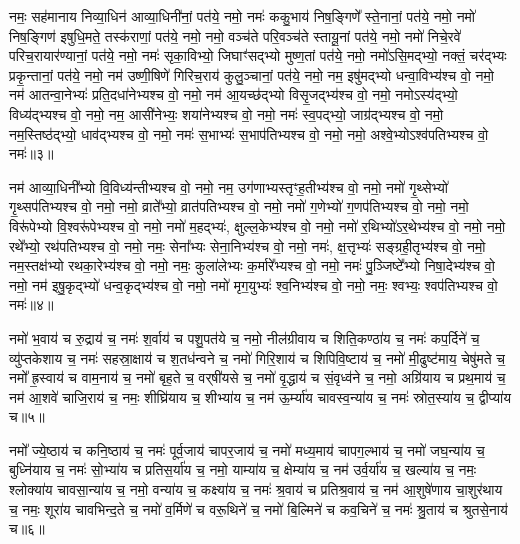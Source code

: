 नमः॒ सह॑मानाय निव्या॒धिन॑ आव्या॒धिनी॑नां॒ पत॑ये॒ नमो॒ नमः॑ ककु॒भाय॑ निष॒ङ्गिणे᳚ स्ते॒नानां॒ पत॑ये॒ नमो॒ नमो॑ निष॒ङ्गिण॑ इषुधि॒मते॒ तस्क॑राणां॒ पत॑ये॒ नमो॒ नमो॒ वञ्च॑ते परि॒वञ्च॑ते स्तायू॒नां पत॑ये॒ नमो॒ नमो॑ निचे॒रवे॑ परिच॒रायार॑ण्यानां॒ पत॑ये॒ नमो॒ नमः॑ सृका॒विभ्यो॒ जिघाꣳ॑सद्भ्यो मुष्ण॒तां पत॑ये॒ नमो॒ नमो॑ऽसि॒मद्भ्यो॒ नक्तं॒ चर॑द्भ्यः प्रकृ॒न्तानां॒ पत॑ये॒ नमो॒ नम॑ उष्णी॒षिणे॑ गिरिच॒राय॑ कुलु॒ञ्चानां॒ पत॑ये॒ नमो॒ नम॒ इषु॑मद्भ्यो धन्वा॒विभ्य॑श्च वो॒ नमो॒ नम॑ आतन्वा॒नेभ्यः॑ प्रति॒दधा॑नेभ्यश्च वो॒ नमो॒ नम॑ आ॒यच्छ॑द्भ्यो विसृ॒जद्भ्य॑श्च वो॒ नमो॒ नमोऽस्य॑द्भ्यो॒ विध्य॑द्भ्यश्च वो॒ नमो॒ नम॒ आसी॑नेभ्यः॒ शया॑नेभ्यश्च वो॒ नमो॒ नमः॑ स्व॒पद्भ्यो॒ जाग्र॑द्भ्यश्च वो॒ नमो॒ नम॒स्तिष्ठ॑द्भ्यो॒ धाव॑द्भ्यश्च वो॒ नमो॒ नमः॑ स॒भाभ्यः॑ स॒भाप॑तिभ्यश्च वो॒ नमो॒ नमो॒ अश्वे॒भ्योऽश्व॑पतिभ्यश्च वो॒ नमः॑॥३॥ 

नम॑ आव्या॒धिनी᳚भ्यो वि॒विध्य॑न्तीभ्यश्च वो॒ नमो॒ नम॒ उग॑णाभ्यस्तृꣳ\-ह॒तीभ्य॑श्च वो॒ नमो॒ नमो॑ गृ॒थ्सेभ्यो॑ गृ॒थ्सप॑तिभ्यश्च वो॒ नमो॒ नमो॒ व्राते᳚भ्यो॒ व्रात॑पतिभ्यश्च वो॒ नमो॒ नमो॑ ग॒णेभ्यो॑ ग॒णप॑तिभ्यश्च वो॒ नमो॒ नमो॒ विरू॑पेभ्यो वि॒श्वरू॑पेभ्यश्च वो॒ नमो॒ नमो॑ म॒हद्भ्यः॑, क्षुल्ल॒केभ्य॑श्च वो॒ नमो॒ नमो॑ र॒थिभ्यो॑ऽर॒थेभ्य॑श्च वो॒ नमो॒ नमो॒ रथे᳚भ्यो॒ रथ॑पतिभ्यश्च वो॒ नमो॒ नमः॒ सेना᳚भ्यः सेना॒निभ्य॑श्च वो॒ नमो॒ नमः॑, क्ष॒त्तृभ्यः॑ सङ्ग्रही॒तृभ्य॑श्च वो॒ नमो॒ नम॒स्तक्ष॑भ्यो रथका॒रेभ्य॑श्च वो॒ नमो॒ नमः॒ कुला॑लेभ्यः क॒र्मारे᳚भ्यश्च वो॒ नमो॒ नमः॑ पु॒ञ्जिष्टे᳚भ्यो निषा॒देभ्य॑श्च वो॒ नमो॒ नम॑ इषु॒कृद्भ्यो॑ धन्व॒कृद्भ्य॑श्च वो॒ नमो॒ नमो॑ मृग॒युभ्यः॑ श्व॒निभ्य॑श्च वो॒ नमो॒ नमः॒ श्वभ्यः॒ श्वप॑तिभ्यश्च वो॒ नमः॑॥४॥ 

नमो॑ भ॒वाय॑ च रु॒द्राय॑ च॒ नमः॑ श॒र्वाय॑ च पशु॒पत॑ये च॒ नमो॒ नील॑ग्रीवाय च शिति॒कण्ठा॑य च॒ नमः॑ कप॒र्दिने॑ च॒ व्यु॑प्तकेशाय च॒ नमः॑ सहस्रा॒क्षाय॑ च श॒तध॑न्वने च॒ नमो॑ गिरि॒शाय॑ च शिपिवि॒ष्टाय॑ च॒ नमो॑ मी॒ढुष्ट॑माय॒ चेषु॑मते च॒ नमो᳚ ह्र॒स्वाय॑ च वाम॒नाय॑ च॒ नमो॑ बृह॒ते च॒ वर्‌षी॑यसे च॒ नमो॑ वृ॒द्धाय॑ च सं॒वृध्व॑ने च॒ नमो॒ अग्रि॑याय च प्रथ॒माय॑ च॒ नम॑ आ॒शवे॑ चाजि॒राय॑ च॒ नमः॒ शीघ्रि॑याय च॒ शीभ्या॑य च॒ नम॑ ऊ॒र्म्या॑य चावस्व॒न्या॑य च॒ नमः॑ स्रोत॒स्या॑य च॒ द्वीप्या॑य च॥५॥ 

नमो᳚ ज्ये॒ष्ठाय॑ च कनि॒ष्ठाय॑ च॒ नमः॑ पूर्व॒जाय॑ चापर॒जाय॑ च॒ नमो॑ मध्य॒माय॑ चापग॒ल्भाय॑ च॒ नमो॑ जघ॒न्या॑य च॒ बुध्नि॑याय च॒ नमः॑ सो॒भ्या॑य च प्रतिस॒र्या॑य च॒ नमो॒ याम्या॑य च॒ क्षेम्या॑य च॒ नम॑ उर्व॒र्या॑य च॒ खल्या॑य च॒ नमः॒ श्लोक्या॑य चावसा॒न्या॑य च॒ नमो॒ वन्या॑य च॒ कक्ष्या॑य च॒ नमः॑ श्र॒वाय॑ च प्रतिश्र॒वाय॑ च॒ नम॑ आ॒शुषे॑णाय चा॒शुर॑थाय च॒ नमः॒ शूरा॑य चावभिन्द॒ते च॒ नमो॑ व॒र्मिणे॑ च वरू॒थिने॑ च॒ नमो॑ बि॒ल्मिने॑ च कव॒चिने॑ च॒ नमः॑ श्रु॒ताय॑ च श्रुतसे॒नाय॑ च॥६॥ 


